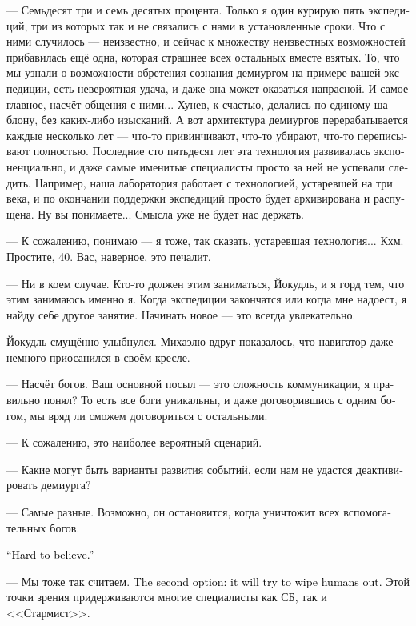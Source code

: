 \documentclass[a4paper,12pt,fleqn]{book}\usepackage{cooltooltips}\usepackage{polyglossia}\setdefaultlanguage[babelshorthands=true]{russian}\setotherlanguage{english}\defaultfontfeatures{Ligatures=TeX,Mapping=tex-text} \usepackage{xcolor}\definecolor{lightgray}{HTML}{bbbbbb}\color{lightgray}\newcommand{\ml}[3]{\textenglish{\textcolor{black}{#3}}}
\begin{document}
--- Семьдесят три и семь десятых процента.
Только я один курирую пять экспедиций, три из которых так и не связались с нами в установленные сроки.
Что с ними случилось --- неизвестно, и сейчас к множеству неизвестных возможностей прибавилась ещё одна, которая страшнее всех остальных вместе взятых.
То, что мы узнали о возможности обретения сознания демиургом на примере вашей экспедиции, есть невероятная удача, и даже она может оказаться напрасной.
И самое главное, насчёт общения с ними...
Хунев, к счастью, делались по единому шаблону, без каких-либо изысканий.
А вот архитектура демиургов перерабатывается каждые несколько лет --- что-то привинчивают, что-то убирают, что-то переписывают полностью.
Последние сто пятьдесят лет эта технология развивалась экспоненциально, и даже самые именитые специалисты просто за ней не успевали следить.
Например, наша лаборатория работает с технологией, устаревшей на три века, и по окончании поддержки экспедиций просто будет архивирована и распущена.
Ну вы понимаете...
Смысла уже не будет нас держать.

--- К сожалению, понимаю --- я тоже, так сказать, устаревшая технология...
Кхм.
Простите, 40.
Вас, наверное, это печалит.

--- Ни в коем случае.
Кто-то должен этим заниматься, Йокудль, и я горд тем, что этим занимаюсь именно я.
Когда экспедиции закончатся или когда мне надоест, я найду себе другое занятие.
Начинать новое --- это всегда увлекательно.

Йокудль смущённо улыбнулся.
Михаэлю вдруг показалось, что навигатор даже немного приосанился в своём кресле.

--- Насчёт богов.
Ваш основной посыл --- это сложность коммуникации, я правильно понял?
То есть все боги уникальны, и даже договорившись с одним богом, мы вряд ли сможем договориться с остальными.

--- К сожалению, это наиболее вероятный сценарий.

--- Какие могут быть варианты развития событий, если нам не удастся деактивировать демиурга?

--- Самые разные.
Возможно, он остановится, когда уничтожит всех вспомогательных богов.

\ml{$0$}
{--- Это сомнительно.}
{``Hard to believe.''}

--- Мы тоже так считаем.
\ml{$0$}
{Второй вариант --- он попытается уничтожить людей.}
{The second option: it will try to wipe humans out.}
Этой точки зрения придерживаются многие специалисты как СБ, так и <<Стармист>>.
\end{document}
